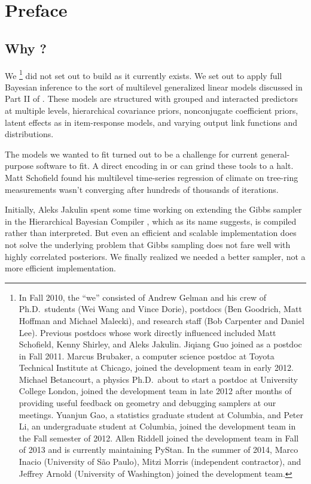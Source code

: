 \chapter*{Preface}

\section*{Why \Stan?}

We%
%
\footnote{In Fall 2010, the ``we'' consisted of Andrew Gelman and his
  crew of Ph.D.\ students (Wei Wang and Vince Dorie), postdocs (Ben
  Goodrich, Matt Hoffman and Michael Malecki), and research staff (Bob
  Carpenter and Daniel Lee).  Previous postdocs whose work directly
  influenced \Stan included Matt Schofield, Kenny Shirley, and Aleks
  Jakulin.  Jiqiang Guo joined as a postdoc in Fall 2011.  Marcus
  Brubaker, a computer science postdoc at Toyota Technical Institute
  at Chicago, joined the development team in early 2012.  Michael
  Betancourt, a physics Ph.D.\ about to start a postdoc at University
  College London, joined the development team in late 2012 after
  months of providing useful feedback on geometry and debugging
  samplers at our meetings. Yuanjun Gao, a statistics graduate student
  at Columbia, and Peter Li, an undergraduate student at Columbia,
  joined the development team in the Fall semester of 2012.  Allen
  Riddell joined the development team in Fall of 2013 and is currently
  maintaining PyStan.  In the summer of 2014, Marco Inacio (University
  of S\~ao Paulo), Mitzi Morris (independent contractor), and Jeffrey
  Arnold (University of Washington) joined the development team. }
%
did not set out to build \Stan as it currently exists.  We set out to
apply full Bayesian inference to the sort of multilevel generalized
linear models discussed in Part II of \citep{GelmanHill:2007}.  These
models are structured with grouped and interacted predictors at
multiple levels, hierarchical covariance priors, nonconjugate
coefficient priors, latent effects as in item-response models, and
varying output link functions and distributions.

The models we wanted to fit turned out to be a challenge for current
general-purpose software to fit.  A direct encoding in \BUGS or \JAGS
can grind these tools to a halt.  Matt Schofield found his multilevel
time-series regression of climate on tree-ring measurements wasn't
converging after hundreds of thousands of iterations.

Initially, Aleks Jakulin spent some time working on extending the
Gibbs sampler in the Hierarchical Bayesian Compiler
\citep{DaumeIII:2007}, which as its name suggests, is compiled rather
than interpreted.  But even an efficient and scalable implementation
does not solve the underlying problem that Gibbs sampling does not
fare well with highly correlated posteriors.  We finally realized we
needed a better sampler, not a more efficient implementation.

